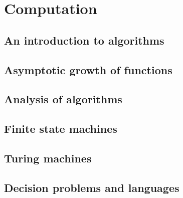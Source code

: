 \section{Computation}
\subsection{An introduction to algorithms}
\subsection{Asymptotic growth of functions}
\subsection{Analysis of algorithms}
\subsection{Finite state machines}
\subsection{Turing machines}
\subsection{Decision problems and languages}